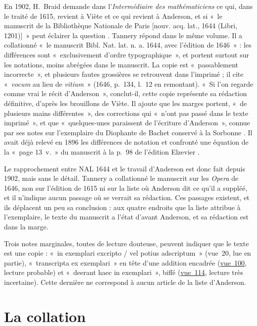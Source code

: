 \documentclass[11pt,a4paper]{article}
\theoremstyle{remark}
\newcommand{\vue}[1]{\href{https://gallica.bnf.fr/ark:/12148/btv1b10033620q/f#1.item}{vue~#1}}
\begin{document}
En 1902, H.~Braid demande dans l'\emph{Intermédiaire des mathématiciens}
ce qui, dans le traité de 1615, revient à Viète et ce qui revient à
Anderson, et si «~le manuscrit de la Bibliothèque Nationale de Paris
[nouv. acq. lat., 1644 (Libri, 1201)]~» peut éclairer la question
\cite{braid1902}. Tannery répond dans le même volume. Il a collationné
«~le manuscrit Bibl. Nat. lat. n. a. 1644, avec l'édition de 1646~» : les
différences sont «~exclusivement d'ordre typographique~», et portent
surtout sur les notations, moins abrégées dans le manuscrit. La copie est
«~passablement incorrecte~», et plusieurs fautes grossières se retrouvent
dans l'imprimé ; il cite «~\emph{vocum} au lieu de \emph{vitium}~»
(1646, p.~134, l.~12 en remontant). «~Si l'on regarde comme vrai le récit
d'Anderson~», conclut-il, cette copie représente sa rédaction définitive,
d'après les brouillons de Viète. Il ajoute que les marges portent, «~de
plusieurs mains différentes~», des corrections qui «~n'ont pas passé dans
le texte imprimé~», et que «~quelques-unes paraissent de l'écriture
d'Anderson~», connue par ses notes sur l'exemplaire du Diophante de Bachet
conservé à la Sorbonne \cite[réimpr. p.~410--411]{tannery1902}. Il avait
déjà relevé en 1896 les différences de notation et confronté une équation
de la «~page 13~v.~» du manuscrit à la p.~98 de l'édition Elzevier
\cite[p.~209--210]{tannery1896}.

Le rapprochement entre NAL 1644 et le travail d'Anderson est donc fait
depuis 1902, mais sans le détail. Tannery a collationné le manuscrit sur
les \emph{Opera} de 1646, non sur l'édition de 1615 ni sur la liste où
Anderson dit ce qu'il a suppléé, et il n'indique aucun passage où se
verrait sa rédaction. Ces passages existent, et ils déplacent un peu sa
conclusion : aux quatre endroits que la liste attribue à l'exemplaire, le
texte du manuscrit a l'état d'avant Anderson, et sa rédaction est dans la
marge.

Trois notes marginales, toutes de lecture douteuse, peuvent indiquer que le
texte est une copie : «~in exemplari excripto / vel potius adscriptum~»
(vue~20, lue en partie), «~transcripta ex exemplari~» en tête d'une addition
encadrée (\vue{100}, lecture probable) et «~deerant haec in exemplari~»,
biffé (\vue{114}, lecture très incertaine). Cette dernière ne correspond à
aucun article de la liste d'Anderson.

\section{La collation}\label{sec:collation}
\end{document}
